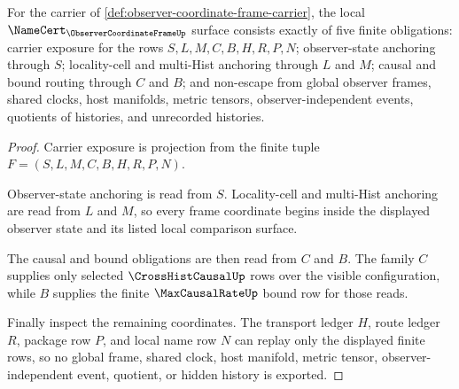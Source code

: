 \begin{theorem}
\label{thm:observer-coordinate-frame-namecert-obligations}
For the carrier of \autoref{def:observer-coordinate-frame-carrier}, the local $\NameCert_{\ObserverCoordinateFrameUp}$ surface consists exactly of five finite obligations: carrier exposure for the rows $S,L,M,C,B,H,R,P,N$; observer-state anchoring through $S$; locality-cell and multi-Hist anchoring through $L$ and $M$; causal and bound routing through $C$ and $B$; and non-escape from global observer frames, shared clocks, host manifolds, metric tensors, observer-independent events, quotients of histories, and unrecorded histories.
\end{theorem}
\begin{proof}
Carrier exposure is projection from the finite tuple $F=(S,L,M,C,B,H,R,P,N)$.

Observer-state anchoring is read from $S$. Locality-cell and multi-Hist anchoring are read from $L$ and $M$, so every frame coordinate begins inside the displayed observer state and its listed local comparison surface.

The causal and bound obligations are then read from $C$ and $B$. The family $C$ supplies only selected $\CrossHistCausalUp$ rows over the visible configuration, while $B$ supplies the finite $\MaxCausalRateUp$ bound row for those reads.

Finally inspect the remaining coordinates. The transport ledger $H$, route ledger $R$, package row $P$, and local name row $N$ can replay only the displayed finite rows, so no global frame, shared clock, host manifold, metric tensor, observer-independent event, quotient, or hidden history is exported.
\end{proof}

